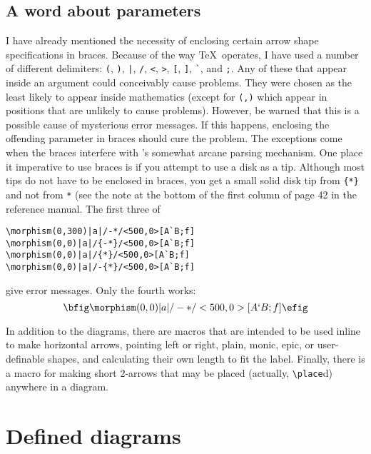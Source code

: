 \documentclass[12pt]{article}
\begin{document}
{\subsection{A word about parameters}
 I have already mentioned the necessity of enclosing certain arrow shape
specifications in braces.  Because of the way \TeX\ operates, I have
used a number of different delimiters:  \index{(}\verb.(.,
\index{)}\verb.)., \index{|}\verb.|., \index{/}\verb./.,
\index{<}\verb.<., \index{>}\verb.>., \index{[}\verb.[.,
\index{]}\verb.]., \verb.`., and \index{;}\verb.;..  Any of
these that appear inside an argument could conceivably cause problems.
They were chosen as the least likely to appear inside mathematics
(except for \index{(,)}\verb.(,). which appear in positions that are
unlikely to cause problems).  However, be warned that this is a possible
cause of mysterious error messages.  If this happens, enclosing the
offending parameter in braces should cure the problem.  The exceptions
come when the braces interfere with \xypic's somewhat arcane parsing
mechanism.  One place it imperative to use braces is if you attempt to
use a disk as a tip.  Although most tips do not have to be enclosed in
braces, you get a small solid disk tip from \index{{*}}\verb.{*}. and
not from \index{*}\verb.*.  (see the note at the bottom of the first
column of page 42 in the reference manual.  The first three of
\begin{verbatim}
\morphism(0,300)|a|/-*/<500,0>[A`B;f]
\morphism(0,0)|a|/{-*}/<500,0>[A`B;f]
\morphism(0,0)|a|/{*}/<500,0>[A`B;f]
\morphism(0,0)|a|/-{*}/<500,0>[A`B;f]
\end{verbatim}
 give error messages.  Only the fourth works:
 $$\bfig
\morphism(0,0)|a|/-{*}/<500,0>[A`B;f]
 \efig$$

In addition to the diagrams, there are macros that are intended to be
used inline to make horizontal arrows, pointing left or right, plain,
monic, epic, or user-definable shapes, and calculating their own length
to fit the label.  Finally, there is a macro for making short 2-arrows
that may be placed (actually, \verb.\place.d) anywhere in
a diagram.


\section{Defined diagrams}

}
\end{document}
